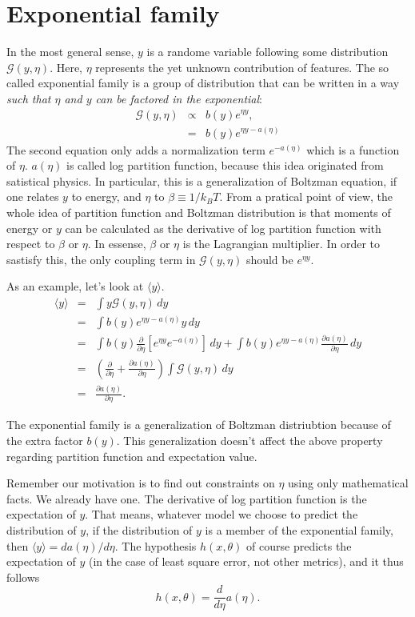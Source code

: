 \section{Exponential family}
In the most general sense, $y$ is a randome variable following some distribution $\mathcal G(y, \eta)$. Here, $\eta$ represents the yet unknown contribution of features. The so called exponential family is a group of distribution that can be written in a way \emph{such that $\eta$ and $y$ can be factored in the exponential}:
\begin{eqnarray}
	\mathcal G(y, \eta) &\propto& b(y)e^{\eta y},\\
			 &=& b(y)e^{\eta y - a(\eta)}\label{eqn:exponential-family}
\end{eqnarray}
The second equation only adds a normalization term $e^{-a(\eta)}$ which is a function of $\eta$. $a(\eta)$ is called log partition function, because this idea originated from satistical physics. In particular, this is a generalization of Boltzman equation, if one relates $y$ to energy, and $\eta$ to $\beta\equiv 1/k_BT$. From a pratical point of view, the whole idea of partition function and Boltzman distribution is that moments of energy or $y$ can be calculated as the derivative of log partition function with respect to $\beta$ or $\eta$. In essense, $\beta$ or $\eta$ is the Lagrangian multiplier. In order to sastisfy this, the only coupling term in $\mathcal G(y, \eta)$ should be $e^{\eta y}$.

As an example, let's look at $\langle y\rangle$.
\begin{eqnarray}
	\langle y\rangle &=&\int y\mathcal G(y, \eta)\, dy\\
		   &=&\int b(y)e^{\eta y -a(\eta)}y\,dy\\
     &=&\int b(y)\frac{\partial}{\partial\eta}\left[e^{\eta y}e^{-a(\eta)}\right]\,dy + \int b(y)e^{\eta y-a(\eta)}\frac{\partial a(\eta)}{\partial\eta}\,dy\\
	&=&(\frac{\partial}{\partial\eta}+ \frac{\partial a(\eta)}{\partial\eta})\int \mathcal G(y, \eta)\, dy\\
	&=&\frac{\partial a(\eta)}{\partial\eta}.\label{eqn:average}
\end{eqnarray}

The exponential family is a generalization of Boltzman distriubtion because of the extra factor $b(y)$. This generalization doesn't affect the above property regarding partition function and expectation value.

Remember our motivation is to find out constraints on $\eta$ using only mathematical facts. We already have one. The derivative of log partition function is the expectation of $y$. That means, whatever model we choose to predict the distribution of $y$, if the distribution of $y$ is a member of the exponential family, then $\langle y\rangle=da(\eta)/d\eta$. The hypothesis $h(x, \theta)$ of course predicts the expectation of $y$ (in the case of least square error, not other metrics), and it thus follows
\begin{equation}
	h(x, \theta) = \frac{d}{d\eta}a(\eta). \label{eqn:exponential_hypo}
\end{equation}


